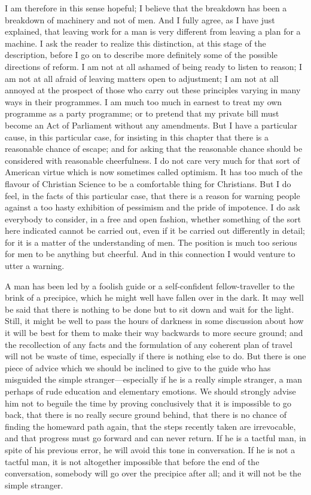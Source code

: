 \documentclass{book}
\begin{document}
I am therefore in this sense hopeful; I believe that the breakdown has been a breakdown of machinery and not of men. And I fully agree, as I have just explained, that leaving work for a man is very different from leaving a plan for a machine. I ask the reader to realize this distinction, at this stage of the description, before I go on to describe more definitely some of the possible directions of reform. I am not at all ashamed of being ready to listen to reason; I am not at all afraid of leaving matters open to adjustment; I am not at all annoyed at the prospect of those who carry out these principles varying in many ways in their programmes. I am much too much in earnest to treat my own programme as a party programme; or to pretend that my private bill must become an Act of Parliament without any amendments. But I have a particular cause, in this particular case, for insisting in this chapter that there is a reasonable chance of escape; and for asking that the reasonable chance should be considered with reasonable cheerfulness. I do not care very much for that sort of American virtue which is now sometimes called optimism. It has too much of the flavour of Christian Science to be a comfortable thing for Christians. But I do feel, in the facts of this particular case, that there is a reason for warning people against a too hasty exhibition of pessimism and the pride of impotence. I do ask everybody to consider, in a free and open fashion, whether something of the sort here indicated cannot be carried out, even if it be carried out differently in detail; for it is a matter of the understanding of men. The position is much too serious for men to be anything but cheerful. And in this connection I would venture to utter a warning.

A man has been led by a foolish guide or a self-confident fellow-traveller to the brink of a precipice, which he might well have fallen over in the dark. It may well be said that there is nothing to be done but to sit down and wait for the light. Still, it might be well to pass the hours of darkness in some discussion about how it will be best for them to make their way backwards to more secure ground; and the recollection of any facts and the formulation of any coherent plan of travel will not be waste of time, especially if there is nothing else to do. But there is one piece of advice which we should be inclined to give to the guide who has misguided the simple stranger—especially if he is a really simple stranger, a man perhaps of rude education and elementary emotions. We should strongly advise him not to beguile the time by proving conclusively that it is impossible to go back, that there is no really secure ground behind, that there is no chance of finding the homeward path again, that the steps recently taken are irrevocable, and that progress must go forward and can never return. If he is a tactful man, in spite of his previous error, he will avoid this tone in conversation. If he is not a tactful man, it is not altogether impossible that before the end of the conversation, somebody will go over the precipice after all; and it will not be the simple stranger.
\end{document}
